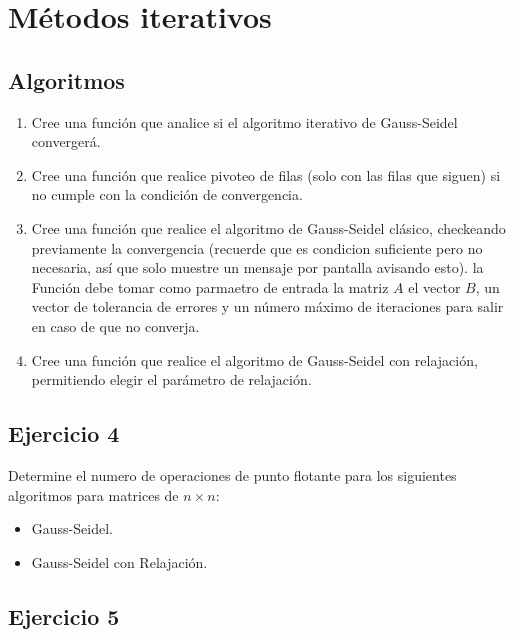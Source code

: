 \documentclass[a4paper,11pt]{article}
\theoremstyle{mytheor}
\begin{document}
\section*{Métodos iterativos}

\subsection*{Algoritmos}

\begin{enumerate}[label=\Roman*]

\item Cree una función que analice si el algoritmo iterativo de Gauss-Seidel convergerá.

\item Cree una función que realice pivoteo de filas (solo con las filas que siguen) si no cumple con la condición de convergencia.

\item Cree una función que realice el algoritmo de Gauss-Seidel clásico, checkeando previamente la convergencia (recuerde que es condicion suficiente pero no necesaria, así que solo muestre un mensaje por pantalla avisando esto). la Función debe tomar como parmaetro de entrada la matriz $A$ el vector $B$, un vector de tolerancia de errores y un número máximo de iteraciones para salir en caso de que no converja. 

\item Cree una función que realice el algoritmo de Gauss-Seidel con relajación, permitiendo elegir el parámetro de relajación.
 
\end{enumerate}


\subsection*{Ejercicio 4}

Determine el numero de operaciones de punto flotante para los siguientes algoritmos para matrices de $n\times	n$:
\begin{itemize}
\item Gauss-Seidel.
\item Gauss-Seidel con Relajación.
\end{itemize}

\subsection*{Ejercicio 5}
\end{document}

